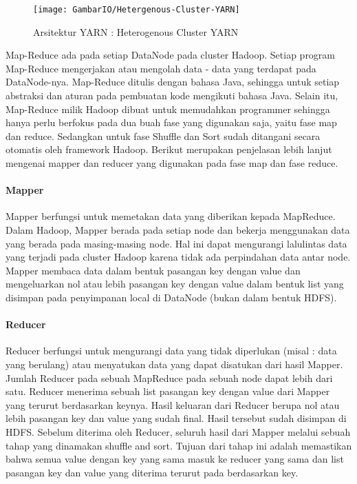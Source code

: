 \begin{figure}[h]
	\centering
	\texttt{[image: GambarIO/Hetergenous-Cluster-YARN]}
	\caption[Arsitektur YARN]{Arsitektur YARN : Heterogenous Cluster YARN}
	\label{fig:Arsitektur YARN : Heterogenous Cluster YARN}
\end{figure}


Map-Reduce ada pada setiap DataNode pada cluster Hadoop. Setiap program Map-Reduce mengerjakan atau mengolah data - data yang terdapat pada DataNode-nya. Map-Reduce ditulis dengan bahasa Java, sehingga untuk setiap abstraksi dan aturan pada pembuatan kode mengikuti bahasa Java. Selain itu, Map-Reduce milik Hadoop dibuat untuk memudahkan programmer sehingga hanya perlu berfokus pada dua buah fase yang digunakan saja, yaitu fase map dan reduce. Sedangkan untuk fase Shuffle dan Sort sudah ditangani secara otomatis oleh framework Hadoop. Berikut merupakan penjelasan lebih lanjut mengenai mapper dan reducer yang digunakan pada fase map dan fase reduce.

\paragraph{Mapper} 

Mapper berfungsi untuk memetakan data yang diberikan kepada MapReduce. Dalam Hadoop, Mapper berada pada setiap node dan bekerja menggunakan data yang berada pada masing-masing node. Hal ini dapat mengurangi lalulintas data yang terjadi pada cluster Hadoop karena tidak ada perpindahan data antar node. Mapper membaca data dalam bentuk pasangan key dengan value dan mengeluarkan nol atau lebih pasangan key dengan value dalam bentuk list yang disimpan pada penyimpanan local di DataNode (bukan dalam bentuk HDFS).

\paragraph{Reducer}

Reducer berfungsi untuk mengurangi data yang tidak diperlukan (misal : data yang berulang) atau menyatukan data yang dapat disatukan dari hasil Mapper. Jumlah Reducer pada sebuah MapReduce pada sebuah node dapat lebih dari satu. Reducer menerima sebuah list pasangan key dengan value dari Mapper yang terurut berdasarkan keynya. Hasil keluaran dari Reducer berupa nol atau lebih pasangan key dan value yang sudah final. Hasil tersebut sudah disimpan di HDFS. Sebelum diterima oleh Reducer, seluruh hasil dari Mapper melalui sebuah tahap yang dinamakan shuffle and sort. Tujuan dari tahap ini adalah memastikan bahwa semua value dengan key yang sama masuk ke reducer yang sama dan list pasangan key dan value yang diterima terurut pada berdasarkan key.

